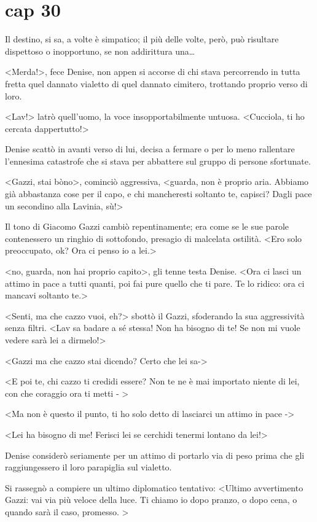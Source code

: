 \chapter{cap 30}

Il destino, si sa, a volte è simpatico; il più delle volte, però, può risultare dispettoso o inopportuno, se non addirittura una\ldots{}

<Merda!>, fece Denise, non appen si accorse di chi stava percorrendo in tutta fretta quel dannato vialetto di quel dannato cimitero, trottando proprio verso di loro.

<Lav!> latrò quell'uomo, la voce insopportabilmente untuosa. <Cucciola, ti ho cercata dappertutto!>

Denise scattò in avanti verso di lui, decisa a fermare o per lo meno rallentare l'ennesima catastrofe che si stava per abbattere sul gruppo di persone sfortunate.

<Gazzi, stai bòno>, cominciò aggressiva, <guarda, non è proprio aria. Abbiamo già abbastanza cose per il capo, e chi mancheresti soltanto te, capisci? Dagli pace un secondino alla Lavinia, sù!>

Il tono di Giacomo Gazzi cambiò repentinamente; era come se le sue parole contenessero un ringhio di sottofondo, presagio di malcelata ostilità. <Ero solo preoccupato, ok? Ora ci penso io a lei.>

<no, guarda, non hai proprio capito>, gli tenne testa Denise. <Ora ci lasci un attimo in pace a tutti quanti, poi fai pure quello che ti pare. Te lo ridico: ora ci mancavi soltanto te.>

<Senti, ma che cazzo vuoi, eh?> sbottò il Gazzi, sfoderando la sua aggressività senza filtri. <Lav sa badare a sé stessa! Non ha bisogno di te! Se non mi vuole vedere sarà lei a dirmelo!>

<Gazzi ma che cazzo stai dicendo? Certo che lei sa->

<E poi te, chi cazzo ti credidi essere? Non te ne è mai importato niente di lei, con che coraggio ora ti metti - >

<Ma non è questo il punto, ti ho solo detto di lasciarci un attimo in pace ->

<Lei ha bisogno di me! Ferisci lei se cerchidi tenermi lontano da lei!>

Denise considerò seriamente per un attimo di portarlo via di peso prima che gli raggiungessero il loro parapiglia sul vialetto.

Si rassegnò a compiere un ultimo diplomatico tentativo: <Ultimo avvertimento Gazzi: vai via più veloce della luce. Ti chiamo io dopo pranzo, o dopo cena, o quando sarà il caso, promesso. >

